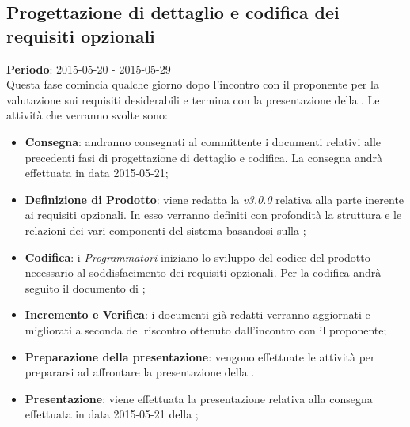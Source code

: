 	\subsection{Progettazione di dettaglio e codifica dei requisiti opzionali} %
	\label{sub:progettazione_di_dettaglio_e_codifica_dei_requisiti_opzionali}
	\textbf{Periodo}:  2015-05-20 - 2015-05-29 \\
	Questa fase comincia qualche giorno dopo l'incontro con il proponente per la valutazione sui requisiti desiderabili e termina con la presentazione della \RQ.
	Le attività che verranno svolte sono:
		\begin{itemize}
			\item \textbf{Consegna}: andranno consegnati al committente i documenti relativi alle precedenti fasi di progettazione di dettaglio e codifica. La consegna andrà effettuata in data 2015-05-21;
			\item \textbf{Definizione di Prodotto}: viene redatta la \docNameDdP{} \emph{v3.0.0} relativa alla parte inerente ai requisiti opzionali. In esso verranno definiti con profondità la struttura e le relazioni dei vari componenti del sistema basandosi sulla \docNameVersionST;
			\item \textbf{Codifica}: i \emph{Programmatori} iniziano lo sviluppo del codice del prodotto necessario al soddisfacimento dei requisiti opzionali. Per la codifica andrà seguito il documento di \docNameVersionDdP;
			\item \textbf{Incremento e Verifica}: i documenti già redatti verranno aggiornati e migliorati a seconda del riscontro ottenuto dall'incontro con il proponente;
			\item \textbf{Preparazione della presentazione}: vengono effettuate le attività per prepararsi ad affrontare la presentazione della \RQ{}.
			\item \textbf{Presentazione}: viene effettuata la presentazione relativa alla consegna effettuata in data 2015-05-21 della \RQ;
		\end{itemize}
			

